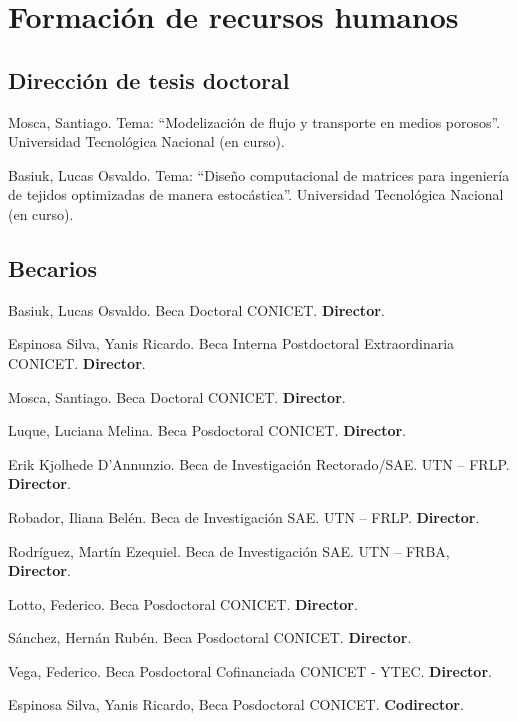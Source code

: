 \section{Formación de recursos humanos}

\subsection{Dirección de tesis doctoral}
 Mosca, Santiago. Tema: ``Modelización de flujo y transporte en medios porosos''. Universidad Tecnológica Nacional (en curso).

 Basiuk, Lucas Osvaldo. Tema: ``Diseño computacional de matrices para ingeniería de tejidos optimizadas de manera estocástica''. Universidad Tecnológica Nacional  (en curso).

\subsection{Becarios}

     Basiuk, Lucas Osvaldo. Beca Doctoral CONICET. \textbf{Director}.

     Espinosa Silva, Yanis Ricardo. Beca Interna Postdoctoral Extraordinaria CONICET. \textbf{Director}.

     Mosca, Santiago. Beca Doctoral CONICET. \textbf{Director}.

     Luque, Luciana Melina. Beca Posdoctoral CONICET. \textbf{Director}.

     Erik Kjolhede D'Annunzio. Beca de Investigación Rectorado/SAE. UTN -- FRLP. \textbf{Director}.

     Robador, Iliana Belén. Beca de Investigación SAE. UTN -- FRLP. \textbf{Director}.

     Rodríguez, Martín Ezequiel. Beca de Investigación SAE. UTN -- FRBA, \textbf{Director}.

     Lotto, Federico. Beca Posdoctoral CONICET. \textbf{Director}.

     Sánchez, Hernán Rubén. Beca Posdoctoral CONICET. \textbf{Director}.

     Vega, Federico. Beca Posdoctoral Cofinanciada CONICET - YTEC. \textbf{Director}.

     Espinosa Silva, Yanis Ricardo, Beca Posdoctoral CONICET. \textbf{Codirector}.

